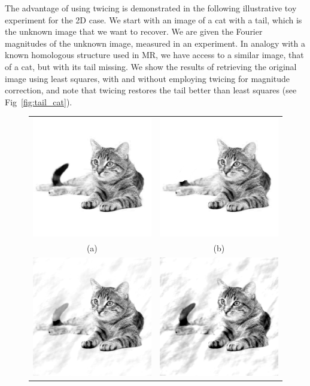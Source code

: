 The advantage of using twicing is demonstrated in the following illustrative 
toy experiment \cite{CowtanCat} for the 2D case. We start with an image of a 
cat with a tail, which is the unknown image that we want to recover. We are 
given the Fourier magnitudes of the unknown image, measured in an experiment. 
In analogy with a known homologous structure used in MR, we have access to a 
similar image, that of a cat, but with its tail missing. We show the results of 
retrieving the original image using least squares, with and without employing 
twicing for magnitude correction, and note that twicing restores the tail 
better than least squares (see Fig~\ref{fig:tail_cat}).

\begin{figure}[]

\centering
\begin{tabular}{cc}
\includegraphics[width=0.3\linewidth]{figures/cat.png}
&\includegraphics[width=0.3\linewidth]{figures/cat_tail.png}\\
(a) & (b)\\
\includegraphics[width=0.3\linewidth]{figures/cat_t1.png}
&\includegraphics[width=0.3\linewidth]{figures/cat_t2.png}\\

\end{tabular}
\end{figure}
